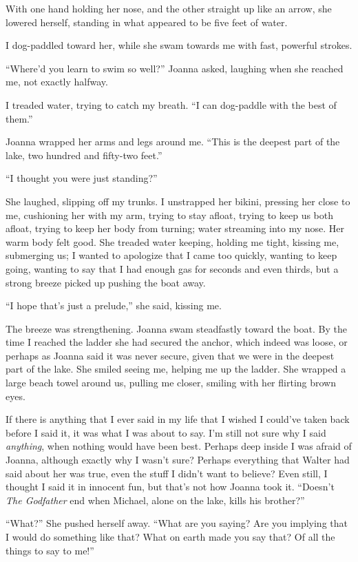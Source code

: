 With one hand holding her nose, and the other straight up like an arrow,
she lowered herself, standing in what appeared to be five feet of water.

I dog-paddled toward her, while she swam towards me with fast, powerful
strokes.

``Where'd you learn to swim so well?'' Joanna asked, laughing when she
reached me, not exactly halfway.

I treaded water, trying to catch my breath. ``I can dog-paddle with the
best of them.''

Joanna wrapped her arms and legs around me. ``This is the deepest part
of the lake, two hundred and fifty-two feet.''

``I thought you were just standing?''

She laughed, slipping off my trunks. I unstrapped her bikini, pressing
her close to me, cushioning her with my arm, trying to stay afloat,
trying to keep us both afloat, trying to keep her body from turning;
water streaming into my nose. Her warm body felt good. She treaded water
keeping, holding me tight, kissing me, submerging us; I wanted to
apologize that I came too quickly, wanting to keep going, wanting to say
that I had enough gas for seconds and even thirds, but a strong breeze
picked up pushing the boat away.

``I hope that's just a prelude,'' she said, kissing me.

The breeze was strengthening. Joanna swam steadfastly toward the boat.
By the time I reached the ladder she had secured the anchor, which
indeed was loose, or perhaps as Joanna said it was never secure, given
that we were in the deepest part of the lake. She smiled seeing me,
helping me up the ladder. She wrapped a large beach towel around us,
pulling me closer, smiling with her flirting brown eyes.

If there is anything that I ever said in my life that I wished I
could've taken back before I said it, it was what I was about to say.
I'm still not sure why I said \emph{anything}, when nothing would have
been best. Perhaps deep inside I was afraid of Joanna, although exactly
why I wasn't sure? Perhaps everything that Walter had said about her was
true, even the stuff I didn't want to believe? Even still, I thought I
said it in innocent fun, but that's not how Joanna took it. ``Doesn't
\emph{The Godfather} end when Michael, alone on the lake, kills his
brother?''

``What?'' She pushed herself away. ``What are you saying? Are you
implying that I would do something like that? What on earth made you say
that? Of all the things to say to me!''

